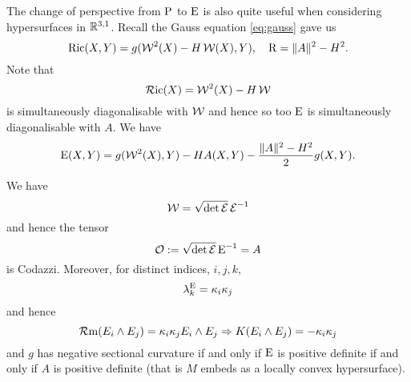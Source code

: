 \documentclass[a4paper, 12pt]{amsart}
\begin{document}
The change of perspective from \(\operatorname{P}\) to \(\operatorname{E}\) is also quite useful when considering hypersurfaces in \(\mathbb{R}^{3,1}\). Recall the Gauss equation \eqref{eq:gauss} gave us
\[
\operatorname{Ric}(X, Y) = g(\operatorname{\mathcal{W}}^2(X) - H \operatorname{\mathcal{W}}(X), Y), \quad \operatorname{R} = \|A\|^2 - H^2.
\]
Note that
\[
\operatorname{\mathcal{R}ic} (X) = \operatorname{\mathcal{W}}^2(X) - H \operatorname{\mathcal{W}}
\]
is simultaneously diagonalisable with \(\operatorname{\mathcal{W}}\) and hence so too \(\operatorname{E}\) is simultaneously diagonalisable with \(A\). We have
\begin{equation}
\label{eq:ein_extrinsic}
\operatorname{E} (X, Y) = g(\operatorname{\mathcal{W}}^2(X), Y) - H A(X, Y) - \frac{\|A\|^2 - H^2}{2} g (X, Y).
\end{equation}

\begin{lemma}
\label{lem:ein_W}

We have
\[
\operatorname{\mathcal{W}} = \sqrt{\det \operatorname{\mathcal{E}}} \operatorname{\mathcal{E}}^{-1}
\]
and hence the tensor
\[
\operatorname{\mathcal{O}} := \sqrt{\det \operatorname{\mathcal{E}}} \operatorname{E}^{-1} = A
\]
is Codazzi. Moreover, for distinct indices, \(i,j,k\),
\[
\lambda^{\operatorname{E}}_k = \kappa_i\kappa_j
\]
and hence
\[
\operatorname{\mathcal{R}m} (E_i \wedge E_j) = \kappa_i \kappa_j E_i \wedge E_j \Rightarrow K(E_i \wedge E_j) = -\kappa_i \kappa_j
\]
and \(g\) has negative sectional curvature if and only if \(\operatorname{E}\) is positive definite if and only if \(A\) is positive definite (that is \(M\) embeds as a locally convex hypersurface).
\end{lemma}
\end{document}
